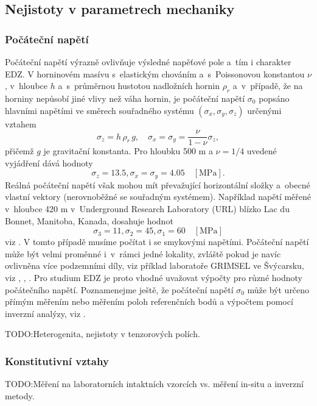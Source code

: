 \documentclass{article}
\def\todo#1{{TODO:\color{violet}#1}}
\begin{document}
\subsection{Nejistoty v parametrech mechaniky}

\subsubsection{Počáteční napětí}
\label{sec:sigma0}
Počáteční napětí výrazně ovlivňuje výsledné napěťové pole a~tím i charakter EDZ.
V horninovém masívu s~elastickým chováním a~s~Poissonovou konstantou $\nu$, v~hloubce $h$ a~s~průměrnou hustotou nadložních hornin $\rho_{r}$ a~v~případě,
že na horniny nepůsobí jiné vlivy než váha hornin, je počáteční napětí $\sigma_0$
popsáno hlavními napětími ve směrech souřadného systému $(\sigma_x, \sigma_y, \sigma_z)$ určenými vztahem
\begin{equation}
	\sigma_z = h\,\rho_{r}\, g, \quad \sigma_x = \sigma_y = \frac{\nu}{1-\nu} \sigma_z,
\end{equation}
přičemž $g$ je gravitační konstanta. Pro hloubku 500 m a $\nu = 1/4$ uvedené vyjádření dává hodnoty
$$
	\sigma_z = 13.5, \sigma_x = \sigma_y = 4.05\quad [\mathrm{MPa}].
$$
Reálná počáteční napětí však mohou mít převažující horizontální složky a~obecné vlastní vektory (nerovnoběžné se souřadným systémem). Například napětí měřené v~hloubce 420 m v~Underground Research Laboratory (URL) blízko Lac du Bonnet, Manitoba, Kanada, dosahuje hodnot
$$
	\sigma_3 = 11, \sigma_2 = 45, \sigma_1 = 60\quad [\mathrm{MPa}]
$$
viz \cite{Rutqvist2009}. V tomto případě musíme počítat i se smykovými napětími. Počáteční napětí může být velmi proměnné i~v~rámci jedné lokality, zvláště pokud je navíc ovlivněna více podzemními díly, viz příklad laboratoře GRIMSEL ve Švýcarsku, viz \cite{Krietsch2019},
\cite{Stas2016}, \cite{Rutqvist2004}. Pro studium EDZ je proto vhodné uvažovat výpočty pro různé hodnoty počátečního napětí.
Poznamenejme  ještě, že počáteční napětí $\sigma_0$ může být určeno přímým měřením nebo měřením poloh referenčních bodů 
a výpočtem pomocí inverzní analýzy, viz \cite{Malik2021}.

\todo{Heterogenita, nejistoty v tenzorových polích.}


\subsubsection{Konstitutivní vztahy}



\todo{Měření na laboratorních intaktních vzorcích vs. měření in-situ a inverzní metody.}
\end{document}

